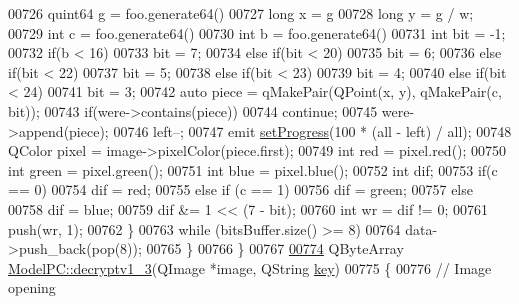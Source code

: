 \begin{DoxyCode}
00726             quint64 g = foo.generate64() %
00727             \textcolor{keywordtype}{long} x = g %
00728             \textcolor{keywordtype}{long} y = g / w;
00729             \textcolor{keywordtype}{int} c = foo.generate64() %
00730             \textcolor{keywordtype}{int} b = foo.generate64() %
00731             \textcolor{keywordtype}{int} bit = -1;
00732             \textcolor{keywordflow}{if}(b < 16)
00733                 bit = 7;
00734             \textcolor{keywordflow}{else} \textcolor{keywordflow}{if}(bit < 20)
00735                 bit = 6;
00736             \textcolor{keywordflow}{else} \textcolor{keywordflow}{if}(bit < 22)
00737                 bit = 5;
00738             \textcolor{keywordflow}{else} \textcolor{keywordflow}{if}(bit < 23)
00739                 bit = 4;
00740             \textcolor{keywordflow}{else} \textcolor{keywordflow}{if}(bit < 24)
00741                 bit = 3;
00742             \textcolor{keyword}{auto} piece = qMakePair(QPoint(x, y), qMakePair(c, bit));
00743             \textcolor{keywordflow}{if}(were->contains(piece))
00744                 \textcolor{keywordflow}{continue};
00745             were->append(piece);
00746             left--;
00747             emit \hyperlink{class_model_p_c_afdcd80f0ed5062e145a71f09b0897547}{setProgress}(100 * (all - left) / all);
00748             QColor pixel = image->pixelColor(piece.first);
00749             \textcolor{keywordtype}{int} red = pixel.red();
00750             \textcolor{keywordtype}{int} green = pixel.green();
00751             \textcolor{keywordtype}{int} blue = pixel.blue();
00752             \textcolor{keywordtype}{int} dif;
00753             \textcolor{keywordflow}{if}(c == 0)
00754                 dif = red;
00755             \textcolor{keywordflow}{else} \textcolor{keywordflow}{if} (c == 1)
00756                 dif = green;
00757             \textcolor{keywordflow}{else}
00758                 dif = blue;
00759             dif &= 1 << (7 - bit);
00760             \textcolor{keywordtype}{int} wr = dif != 0;
00761             push(wr, 1);
00762         \}
00763         \textcolor{keywordflow}{while} (bitsBuffer.size() >= 8)
00764             data->push\_back(pop(8));
00765     \}
00766 \}
00767 
\hypertarget{modelpc_8cpp_source.tex_l00774}{}\hyperlink{class_model_p_c_a4fe70ebbedfaf31d45a35f82d0f06caa}{00774} QByteArray \hyperlink{class_model_p_c_a4fe70ebbedfaf31d45a35f82d0f06caa}{ModelPC::decryptv1\_3}(QImage *image, QString \hyperlink{namespace_errors_dict_setup_a09c268098d09ffb8e5504f30fa6d5dd9}{key})
00775 \{
00776     \textcolor{comment}{// Image opening}

\end{DoxyCode}
